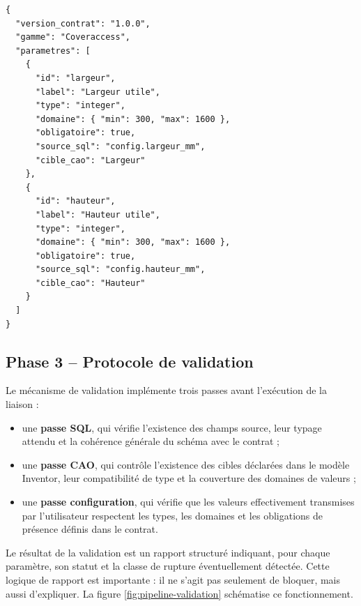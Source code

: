 \begin{lstlisting}[language=jsonmemoire,caption={Extrait simplifié d'un contrat d'interface pour la gamme Coveraccess}]
{
  "version_contrat": "1.0.0",
  "gamme": "Coveraccess",
  "parametres": [
    {
      "id": "largeur",
      "label": "Largeur utile",
      "type": "integer",
      "domaine": { "min": 300, "max": 1600 },
      "obligatoire": true,
      "source_sql": "config.largeur_mm",
      "cible_cao": "Largeur"
    },
    {
      "id": "hauteur",
      "label": "Hauteur utile",
      "type": "integer",
      "domaine": { "min": 300, "max": 1600 },
      "obligatoire": true,
      "source_sql": "config.hauteur_mm",
      "cible_cao": "Hauteur"
    }
  ]
}
\end{lstlisting}

\subsection{Phase 3 -- Protocole de validation}

Le mécanisme de validation implémente trois passes avant l'exécution de la liaison :

\begin{itemize}[leftmargin=1.4cm]
\item une \textbf{passe SQL}, qui vérifie l'existence des champs source, leur typage attendu et la cohérence générale du schéma avec le contrat ;
\item une \textbf{passe CAO}, qui contrôle l'existence des cibles déclarées dans le modèle Inventor, leur compatibilité de type et la couverture des domaines de valeurs ;
\item une \textbf{passe configuration}, qui vérifie que les valeurs effectivement transmises par l'utilisateur respectent les types, les domaines et les obligations de présence définis dans le contrat.
\end{itemize}

Le résultat de la validation est un rapport structuré indiquant, pour chaque paramètre, son statut et la classe de rupture éventuellement détectée. Cette logique de rapport est importante : il ne s'agit pas seulement de bloquer, mais aussi d'expliquer. La figure \ref{fig:pipeline-validation} schématise ce fonctionnement.

